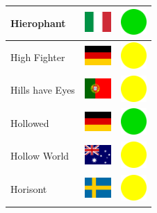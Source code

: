 \documentclass[12pt, a4paper, twoside]{report}
\begin{document}
\begin{center}
\begin{longtable}{|p{5cm}|p{2cm}|p{2cm}|}
Hierophant & \includegraphics[width=1cm]{4x3/it} & \includegraphics[width=1cm]{likes/y} \\ \hline
High Fighter & \includegraphics[width=1cm]{4x3/de} & \includegraphics[width=1cm]{likes/m} \\ \hline
Hills have Eyes & \includegraphics[width=1cm]{4x3/pt} & \includegraphics[width=1cm]{likes/m} \\ \hline
Hollowed & \includegraphics[width=1cm]{4x3/de} & \includegraphics[width=1cm]{likes/y} \\ \hline
Hollow World & \includegraphics[width=1cm]{4x3/au} & \includegraphics[width=1cm]{likes/m} \\ \hline
Horisont & \includegraphics[width=1cm]{4x3/se} & \includegraphics[width=1cm]{likes/m} \\ \hline

\end{longtable}
\end{center}
\end{document}
